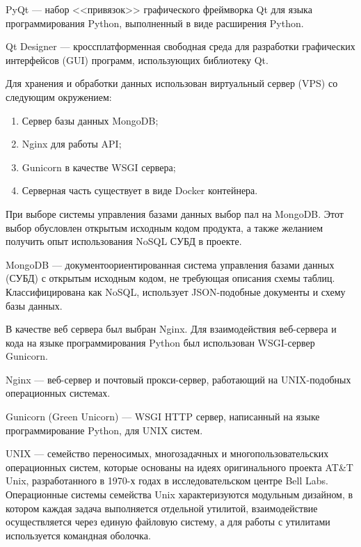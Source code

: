 \begin{definition}
    PyQt --- набор <<привязок>> графического фреймворка Qt для языка программирования Python, выполненный в виде расширения Python.
\end{definition}

\begin{definition}
    Qt Designer --- кроссплатформенная свободная среда для разработки графических интерфейсов (GUI) программ, использующих библиотеку Qt.
\end{definition}

Для хранения и обработки данных использован виртуальный сервер (VPS) со следующим окружением:
\begin{enumerate}
    \item Сервер базы данных MongoDB;
    \item Nginx для работы API;
    \item Gunicorn в качестве WSGI сервера;
    \item Серверная часть существует в виде Docker контейнера.
\end{enumerate}

При выборе системы управления базами данных выбор пал на MongoDB. Этот выбор обусловлен открытым исходным кодом продукта,
а также желанием получить опыт использования NoSQL СУБД в проекте.
\begin{definition}
    MongoDB --- документоориентированная система управления базами данных (СУБД) с открытым исходным кодом,
    не требующая описания схемы таблиц. Классифицирована как NoSQL, использует JSON-подобные документы и схему базы данных.
\end{definition}

В качестве веб сервера был выбран Nginx. Для взаимодействия веб-сервера и кода на языке программирования Python был использован WSGI-сервер Gunicorn.
\begin{definition}
    Nginx --- веб-сервер и почтовый прокси-сервер, работающий на UNIX-подобных операционных системах.
\end{definition}

\begin{definition}
    Gunicorn (Green Unicorn) --- WSGI HTTP сервер, написанный на языке программирование Python, для UNIX систем.
\end{definition}

\begin{definition}
    UNIX --- семейство переносимых, многозадачных и многопользовательских операционных систем, которые основаны на идеях оригинального проекта AT\&T Unix,
    разработанного в 1970-х годах в исследовательском центре Bell Labs. Операционные системы семейства Unix характеризуются модульным дизайном,
    в котором каждая задача выполняется отдельной утилитой, взаимодействие осуществляется через единую файловую систему,
    а для работы с утилитами используется командная оболочка.
\end{definition}

